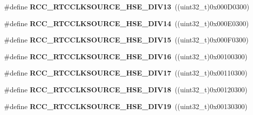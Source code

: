 \begin{DoxyCompactItemize}
\item 
\#define {\bfseries R\+C\+C\+\_\+\+R\+T\+C\+C\+L\+K\+S\+O\+U\+R\+C\+E\+\_\+\+H\+S\+E\+\_\+\+D\+I\+V13}~((uint32\+\_\+t)0x000\+D0300)\hypertarget{group___r_c_c___r_t_c___clock___source_ga2c447a815f2e116f88b604eeaa7aab0b}{}\label{group___r_c_c___r_t_c___clock___source_ga2c447a815f2e116f88b604eeaa7aab0b}

\item 
\#define {\bfseries R\+C\+C\+\_\+\+R\+T\+C\+C\+L\+K\+S\+O\+U\+R\+C\+E\+\_\+\+H\+S\+E\+\_\+\+D\+I\+V14}~((uint32\+\_\+t)0x000\+E0300)\hypertarget{group___r_c_c___r_t_c___clock___source_ga5dceac607cd03d87002cdb78b3234941}{}\label{group___r_c_c___r_t_c___clock___source_ga5dceac607cd03d87002cdb78b3234941}

\item 
\#define {\bfseries R\+C\+C\+\_\+\+R\+T\+C\+C\+L\+K\+S\+O\+U\+R\+C\+E\+\_\+\+H\+S\+E\+\_\+\+D\+I\+V15}~((uint32\+\_\+t)0x000\+F0300)\hypertarget{group___r_c_c___r_t_c___clock___source_ga9594f8553a259c18fb354e903c01b041}{}\label{group___r_c_c___r_t_c___clock___source_ga9594f8553a259c18fb354e903c01b041}

\item 
\#define {\bfseries R\+C\+C\+\_\+\+R\+T\+C\+C\+L\+K\+S\+O\+U\+R\+C\+E\+\_\+\+H\+S\+E\+\_\+\+D\+I\+V16}~((uint32\+\_\+t)0x00100300)\hypertarget{group___r_c_c___r_t_c___clock___source_ga48e1ffd844b9e9192c5d7dbeed20765f}{}\label{group___r_c_c___r_t_c___clock___source_ga48e1ffd844b9e9192c5d7dbeed20765f}

\item 
\#define {\bfseries R\+C\+C\+\_\+\+R\+T\+C\+C\+L\+K\+S\+O\+U\+R\+C\+E\+\_\+\+H\+S\+E\+\_\+\+D\+I\+V17}~((uint32\+\_\+t)0x00110300)\hypertarget{group___r_c_c___r_t_c___clock___source_ga62707003a86f4c4747ae89af2e561e0c}{}\label{group___r_c_c___r_t_c___clock___source_ga62707003a86f4c4747ae89af2e561e0c}

\item 
\#define {\bfseries R\+C\+C\+\_\+\+R\+T\+C\+C\+L\+K\+S\+O\+U\+R\+C\+E\+\_\+\+H\+S\+E\+\_\+\+D\+I\+V18}~((uint32\+\_\+t)0x00120300)\hypertarget{group___r_c_c___r_t_c___clock___source_ga264428cbc7bc54bfcd794a4027ac1f5e}{}\label{group___r_c_c___r_t_c___clock___source_ga264428cbc7bc54bfcd794a4027ac1f5e}

\item 
\#define {\bfseries R\+C\+C\+\_\+\+R\+T\+C\+C\+L\+K\+S\+O\+U\+R\+C\+E\+\_\+\+H\+S\+E\+\_\+\+D\+I\+V19}~((uint32\+\_\+t)0x00130300)\hypertarget{group___r_c_c___r_t_c___clock___source_gaf2d8f6e3e5887bb5c853944fd35b677a}{}\label{group___r_c_c___r_t_c___clock___source_gaf2d8f6e3e5887bb5c853944fd35b677a}


\end{DoxyCompactItemize}

